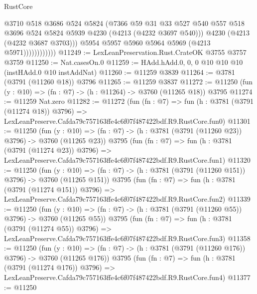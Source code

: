 \begin{lexlean}{RustCore}
\begin{coremodule}
                            @3710
                            @518
                            @3686
                            @524
                            @5824
                            (@7366
                              @59
                              @31
                              @33
                              @527
                              @540
                              @557
                              @518
                              @3696
                              @524
                              @5824
                              @5939
                              @4230
                              (@4213 (@4232 @3697 @540)))
                            @4230
                            (@4213 (@4232 @3687 @3703)))
                          @5954
                          @5957
                          @5960
                          @5964
                          @5969
                          (@4213 @5971))))))))))))
@11249 := LexLeanPreservation.Rust.CrateOK @3755 @3757 @3759
@11250 := Nat.casesOn.{0}
@11259 := HAdd.hAdd.{0, 0, 0} @10 @10 @10 (instHAdd.{0} @10 instAddNat)
@11260 := @11259 @3839
@11264 := @3781 (@3791 (@11260 @18)) @3796
@11265 := @11259 @3837
@11272 := @11250 (fun (y : @10) => (fn : @7) -> (h : @11264) -> @3760 (@11265 @18)) @3795
@11274 := @11259 Nat.zero
@11282 := @11272
    (fun (fn : @7) =>
    fun (h : @3781 (@3791 (@11274 @18)) @3796) =>
    LexLeanPreserve.Cafda79c757163ffe4c6f07f487422bdf.R9.RustCore.fun0)
@11301 := @11250
    (fun (y : @10) => (fn : @7) -> (h : @3781 (@3791 (@11260 @23)) @3796) -> @3760 (@11265 @23))
    @3795
    (fun (fn : @7) =>
    fun (h : @3781 (@3791 (@11274 @23)) @3796) =>
    LexLeanPreserve.Cafda79c757163ffe4c6f07f487422bdf.R9.RustCore.fun1)
@11320 := @11250
    (fun (y : @10) => (fn : @7) -> (h : @3781 (@3791 (@11260 @151)) @3796) -> @3760 (@11265 @151))
    @3795
    (fun (fn : @7) =>
    fun (h : @3781 (@3791 (@11274 @151)) @3796) =>
    LexLeanPreserve.Cafda79c757163ffe4c6f07f487422bdf.R9.RustCore.fun2)
@11339 := @11250
    (fun (y : @10) => (fn : @7) -> (h : @3781 (@3791 (@11260 @55)) @3796) -> @3760 (@11265 @55))
    @3795
    (fun (fn : @7) =>
    fun (h : @3781 (@3791 (@11274 @55)) @3796) =>
    LexLeanPreserve.Cafda79c757163ffe4c6f07f487422bdf.R9.RustCore.fun3)
@11358 := @11250
    (fun (y : @10) => (fn : @7) -> (h : @3781 (@3791 (@11260 @176)) @3796) -> @3760 (@11265 @176))
    @3795
    (fun (fn : @7) =>
    fun (h : @3781 (@3791 (@11274 @176)) @3796) =>
    LexLeanPreserve.Cafda79c757163ffe4c6f07f487422bdf.R9.RustCore.fun4)
@11377 := @11250

\end{coremodule}
\end{lexlean}
